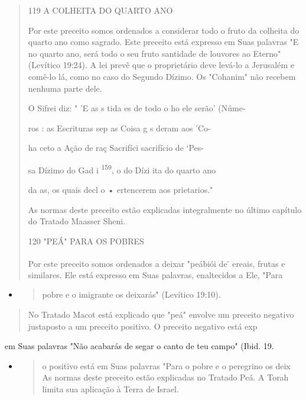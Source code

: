 \begin{quote}
119 A COLHEITA DO QUARTO ANO

Por este preceito somos ordenados a considerar todo o fruto da co­lheita
do quarto ano como sagrado. Este preceito está expresso em Suas
pala­vras "E no quarto ano, será todo o seu fruto santidade de louvores
ao Eterno" (Levítico 19:24). A lei prevê que o proprietário deve levá-lo
a Jerusalém e comê-lo lá, como no caso do Segundo Dízimo. Os "Cohanim"
não recebem nenhuma parte dele.

O Sifrei diz: " 'E as s tida es de todo o ho ele serão' (Núme-

ros : as Escrituras sep as Coisa g s deram aos 'Co-

ha ceto a Ação de raç Sacrifíci sacrifício de `Pes-

sa Dízimo do Gad i \textsuperscript{159}, o do Dízi ita do quarto ano

da as, os quais decl o • ertencerem aos prietarios."

As normas deste preceito estão explicadas integralmente no último
capítulo do Tratado Maasser Sheni.

120 "PEÁ" PARA OS POBRES

Por este preceito somos ordenados a deixar "peábiói
de\textsuperscript{-} ereais, fru­tas e similares. Ele está expresso em
Suas palavras, enaltecidos a Ele, "Para
\end{quote}

\begin{itemize}
\item
  \begin{quote}
  pobre e o imigrante os deixarás" (Levítico 19:10).
  \end{quote}
\end{itemize}

\begin{quote}
No Tratado Macot está explicado que "peá" envolve um preceito negativo
justaposto a um preceito positivo. O preceito negativo está exp
\end{quote}

em Suas palavras "Não acabarás de segar o canto de teu campo" (Ibid. 19.

\begin{itemize}
\item
  \begin{quote}
  o positivo está em Suas palavras "Para o pobre e o peregrino os deix
  As normas deste preceito estão explicadas no Tratado Peá. A Torah
  limita sua aplicação à Terra de Israel.
  \end{quote}
\end{itemize}

